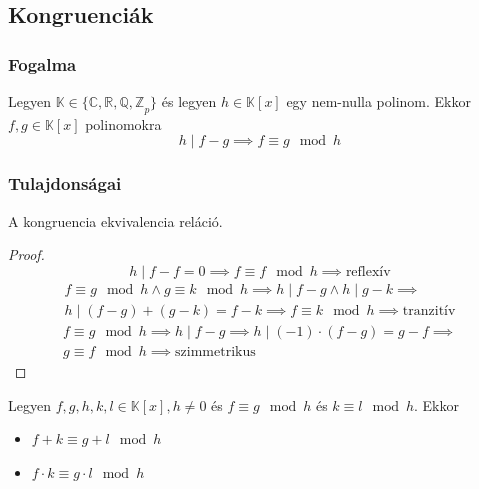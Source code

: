 \setcounter{definition}{0}
\setcounter{theorem}{0}
\subsection{Kongruenciák}
\subsubsection{Fogalma}
\begin{definition}
	Legyen $\mathbb{K} \in \{ \mathbb{C, R, Q, Z}_p \}$ és
	legyen $h \in \mathbb{K}[x]$ egy nem-nulla polinom.
	Ekkor $f, g \in \mathbb{K}[x]$ polinomokra
	\begin{equation*}
		h \mid f - g \implies f \equiv g \mod h
	\end{equation*}
\end{definition}
\subsubsection{Tulajdonságai}
\begin{theorem}
	A kongruencia ekvivalencia reláció.
\end{theorem}
\begin{proof}
	\begin{equation*}
		h \mid f - f = 0 \implies f \equiv f \mod h \implies \text{reflexív}
	\end{equation*}
	\begin{multline*}
		f \equiv g \mod h \land g \equiv k \mod h \implies
		h \mid f - g \land h \mid g - k \implies \\
		h \mid (f - g) + (g - k) = f - k \implies
		f \equiv k \mod h \implies \text{tranzitív}
	\end{multline*}
	\begin{multline*}
		f \equiv g \mod h \implies h \mid f - g \implies
		h \mid (-1 ) \cdot (f - g) = g - f \implies \\
		g \equiv f \mod h \implies \text{szimmetrikus}
	\end{multline*}
\end{proof}
\begin{theorem}
	Legyen $f, g, h, k, l \in \mathbb{K}[x], h \neq 0$ és
	$f \equiv g \mod h$ és $k \equiv l \mod h$. Ekkor
	\begin{itemize}
		\item $f + k \equiv g + l \mod h$
		\item $f \cdot k \equiv g \cdot l \mod h$
	\end{itemize}
\end{theorem}
